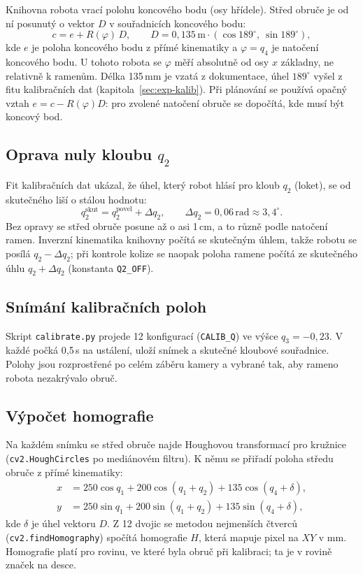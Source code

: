 \documentclass[11pt,a4paper]{article}
\begin{document}
Knihovna robota vrací polohu koncového bodu (osy hřídele). Střed obruče je od ní posunutý
o vektor $D$ v souřadnicích koncového bodu:
\begin{equation}
  c = e + R(\varphi)\,D, \qquad D = 0{,}135\,\mathrm{m}\cdot(\cos 189^\circ,\ \sin 189^\circ),
\end{equation}
kde $e$ je poloha koncového bodu z přímé kinematiky a $\varphi = q_4$ je natočení koncového
bodu. U tohoto robota se $\varphi$ měří absolutně od osy $x$ základny, ne relativně k ramenům.
Délka 135\,mm je vzatá z dokumentace, úhel $189^\circ$ vyšel z fitu kalibračních dat
(kapitola~\ref{sec:exp-kalib}). Při plánování se používá opačný vztah $e = c - R(\varphi)D$:
pro zvolené natočení obruče se dopočítá, kde musí být koncový bod.

\subsection{Oprava nuly kloubu $q_2$}
\label{sec:q2}

Fit kalibračních dat ukázal, že úhel, který robot hlásí pro kloub $q_2$ (loket), se od
skutečného liší o stálou hodnotu:
\begin{equation}
  q_2^\mathrm{skut} = q_2^\mathrm{povel} + \Delta q_2, \qquad \Delta q_2 = 0{,}06\,\mathrm{rad} \approx 3{,}4^\circ .
\end{equation}
Bez opravy se střed obruče posune až o asi 1\,cm, a to různě podle natočení ramen. Inverzní
kinematika knihovny počítá se skutečným úhlem, takže robotu se posílá $q_2 - \Delta q_2$; při
kontrole kolize se naopak poloha ramene počítá ze skutečného úhlu $q_2 + \Delta q_2$
(konstanta \texttt{Q2\_OFF}).

\subsection{Snímání kalibračních poloh}

Skript \texttt{calibrate.py} projede 12 konfigurací (\texttt{CALIB\_Q}) ve výšce $q_3 = -0{,}23$.
V každé počká 0{,}5\,s na ustálení, uloží snímek a skutečné kloubové souřadnice. Polohy jsou
rozprostřené po celém záběru kamery a vybrané tak, aby rameno robota nezakrývalo obruč.

\subsection{Výpočet homografie}

Na každém snímku se střed obruče najde Houghovou transformací pro kružnice
(\texttt{cv2.HoughCircles} po mediánovém filtru). K němu se přiřadí poloha středu obruče
z přímé kinematiky:
\begin{align}
  x &= 250\cos q_1 + 200\cos(q_1+q_2) + 135\cos(q_4 + \delta),\\
  y &= 250\sin q_1 + 200\sin(q_1+q_2) + 135\sin(q_4 + \delta),
\end{align}
kde $\delta$ je úhel vektoru $D$. Z 12 dvojic se metodou nejmenších čtverců
(\texttt{cv2.findHomography}) spočítá homografie $H$, která mapuje pixel na $XY$ v mm.
Homografie platí pro rovinu, ve které byla obruč při kalibraci; ta je v rovině značek na desce.
\end{document}

